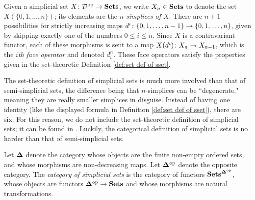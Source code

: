 \documentclass{amsart}
\def\bD{{\bf \Delta}}
\begin{document}
\begin{remark}

Given a simplicial set $X\colon\mathcal{D}^\textnormal{op}\rightarrow{\bf Sets}$, we write $X_n\in{\bf Sets}$ to denote the set $X(\{0,1,\ldots,n\})$; its elements are the {\em $n$-simplices of $X$}.  There are $n+1$ possibilities for strictly increasing maps $d^i\colon \{0,1,\ldots,n-1\}\rightarrow\{0,1,\ldots,n\}$, given by skipping exactly one of the numbers $0\leq i\leq n$.  Since $X$ is a contravariant functor, each of these morphisms is sent to a map $X(d^i)\colon X_n\rightarrow X_{n-1}$, which is the {\em $i$th face operator} and denoted $d^n_i$.  These face operators satisfy the properties given in the set-theoretic Definition \ref{def:set def of sset}.

\end{remark}

The set-theoretic definition of simplicial sets is much more involved than that of semi-simplicial sets, the difference being that $n$-simplices can be ``degenerate," meaning they are really smaller simplices in disguise.  Instead of having one identity (like the displayed formula in Definition \ref{def:set def of sset}), there are six.  For this reason, we do not include the set-theoretic definition of simplicial sets; it can be found in \cite{GJ}.  Luckily, the categorical definition of simplicial sets is no harder than that of semi-simplicial sets.  

\begin{definition}

Let $\bD$ denote the category whose objects are the finite non-empty ordered sets, and whose morphisms are non-decreasing maps.  Let $\bD\op$ denote the opposite category.  The {\em category of simplicial sets} is the category of functors $\Sets^{\bD\op}$, whose objects are functors $\bD\op\to\Sets$ and whose morphisms are natural transformations.

\end{definition}
\end{document}
